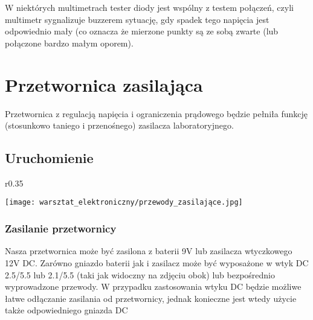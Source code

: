 \documentclass{pdfBooklets}
\begin{document}
W niektórych multimetrach tester diody jest wspólny z testem połączeń, czyli multimetr sygnalizuje buzzerem sytuację,
gdy spadek tego napięcia jest odpowiednio mały (co oznacza że mierzone punkty są ze sobą zwarte (lub połączone bardzo małym oporem).


\section{Przetwornica zasilająca}

Przetwornica z regulacją napięcia i ograniczenia prądowego będzie pełniła funkcję (stosunkowo taniego i przenośnego) zasilacza laboratoryjnego.

\subsection{Uruchomienie}

\begin{wrapfigure}{r}{0.35\textwidth}
  \begin{center}
    \vspace{-40pt}
    \texttt{[image: warsztat\_elektroniczny/przewody\_zasilające.jpg]}
    \vspace{-40pt}
  \end{center}
\end{wrapfigure}

\subsubsection{Zasilanie przetwornicy}

Nasza przetwornica może być zasilona z baterii 9V lub zasilacza wtyczkowego 12V DC.
Zarówno gniazdo baterii jak i zasilacz może być wyposażone w wtyk DC 2.5/5.5 lub 2.1/5.5 (taki jak widoczny na zdjęciu obok) lub bezpośrednio wyprowadzone przewody.
W przypadku zastosowania wtyku DC będzie możliwe łatwe odłączanie zasilania od przetwornicy, jednak konieczne jest wtedy użycie także odpowiedniego gniazda DC
\end{document}
